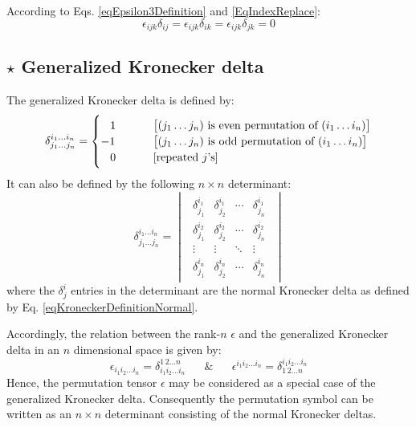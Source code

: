 According to Eqs. \ref{eqEpsilon3Definition} and \ref{EqIndexReplace}:
\begin{equation}
\epsilon_{ijk}\delta_{ij}=\epsilon_{ijk}\delta_{ik}=\epsilon_{ijk}\delta_{jk}=0
\end{equation}




\subsection{$\star$ Generalized Kronecker delta}

 The generalized Kronecker delta is defined by:
\begin{equation}
\delta_{j_{1}\ldots j_{n}}^{i_{1}\ldots i_{n}}=\begin{cases}
\,\,\,\,\,1 & \left[(j_{1}\ldots j_{n})\text{ is even permutation of (\ensuremath{i_{1}\ldots i_{n})}}\right]\\
-1 & \left[(j_{1}\ldots j_{n})\text{ is odd permutation of (\ensuremath{i_{1}\ldots i_{n})}}\right]\\
\,\,\,\,\,0\,\,\,\,\,\,\,\,\,\,\,\,\,\, & \left[\text{repeated\,\,\ensuremath{j}'s}\right]
\end{cases}\label{eqGeneralizedKronecker}
\end{equation}
It can also be defined by the following $n\times n$ determinant:
\begin{equation}
\delta_{j_{1}\ldots j_{n}}^{i_{1}\ldots i_{n}}=\begin{vmatrix}\begin{array}{cccc}
\delta_{j_{1}}^{i_{1}} & \delta_{j_{2}}^{i_{1}} & \cdots & \delta_{j_{n}}^{i_{1}}\\
\delta_{j_{1}}^{i_{2}} & \delta_{j_{2}}^{i_{2}} & \cdots & \delta_{j_{n}}^{i_{2}}\\
\vdots & \vdots & \ddots & \vdots\\
\delta_{j_{1}}^{i_{n}} & \delta_{j_{2}}^{i_{n}} & \cdots & \delta_{j_{n}}^{i_{n}}
\end{array}\end{vmatrix}\label{eqGeneralizedKronecker2}
\end{equation}
where the $\delta_{j}^{i}$ entries in the determinant are the normal
Kronecker delta as defined by Eq. \ref{eqKroneckerDefinitionNormal}.

 Accordingly, the relation between the rank-$n$ $\epsilon$
and the generalized Kronecker delta in an $n$ dimensional space is given by:
\begin{equation}
\epsilon_{i_{1}i_{2}\ldots i_{n}}=\delta_{i_{1}i_{2}\ldots i_{n}}^{1\,2\ldots n}\,\,\,\,\,\,\,\,\,\,\&\,\,\,\,\,\,\,\,\,\,\epsilon^{i_{1}i_{2}\ldots i_{n}}=\delta_{1\,2\ldots n}^{i_{1}i_{2}\ldots i_{n}}
\end{equation}
Hence, the permutation tensor $\epsilon$ may be considered as a special
case of the generalized Kronecker delta. Consequently the permutation
symbol can be written as an $n\times n$ determinant consisting of
the normal Kronecker deltas.

